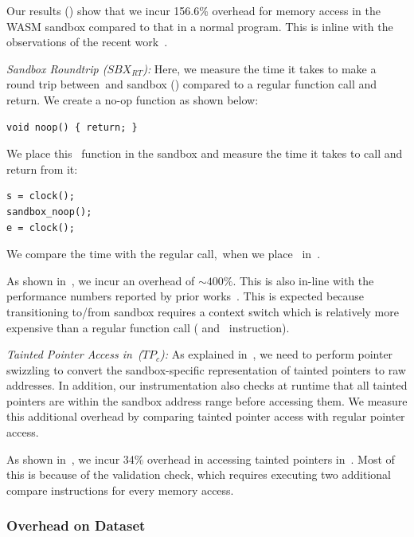 Our results () show that we incur 156.6\% overhead for memory access in the WASM sandbox compared to that in a normal program.
This is inline with the observations of the recent work~\cite{jangda2019not}.

\noindent\emph{Sandbox Roundtrip ($SBX_{RT}$):}
Here, we measure the time it takes to make a round trip between~\cregion and sandbox (\ucregion) compared to a regular function call and return.
We create a no-op function as shown below:
\begin{verbatim}
void noop() { return; }
\end{verbatim}
We place this~ function in the sandbox and measure the time it takes to call and return from it:
\begin{verbatim}
s = clock();
sandbox_noop();
e = clock();
\end{verbatim}
We compare the time with the regular call,~\ie when we place~ in~\cregion.

As shown in~, we incur an overhead of $\sim 400\%$. This is also in-line with the performance numbers reported by prior works~\cite{jangda2019not, rlbox-paper}.
This is expected because transitioning to/from sandbox requires a context switch which is relatively more expensive than a regular function call (\ie{} and~ instruction).

\noindent\emph{Tainted Pointer Access in~\cregion ($TP_{c}$):}
As explained in~, we need to perform pointer swizzling to convert the sandbox-specific representation of tainted pointers to raw addresses.
In addition, our instrumentation also checks at runtime that all tainted pointers are within the sandbox address range before accessing them.
We measure this additional overhead by comparing tainted pointer access with regular pointer access.

As shown in~, we incur 34\% overhead in accessing tainted pointers in~\cregion.
Most of this is because of the validation check, which requires executing two additional compare instructions for every memory access.

\subsubsection{Overhead on Dataset}
\label{subsec:programoverhead}

